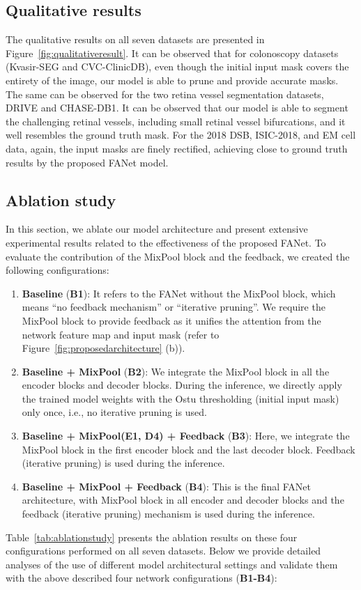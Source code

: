 \documentclass[journal]{IEEEtran}
\begin{document}
\subsection{Qualitative results}
The qualitative results on all seven datasets are presented in Figure~\ref{fig:qualitativeresult}. It can be observed that for colonoscopy datasets (Kvasir-SEG and CVC-ClinicDB), even though the initial input mask covers the entirety of the image, our model is able to prune and provide accurate masks. The same can be observed for the two retina vessel segmentation datasets, DRIVE and CHASE-DB1. It can be observed that our model is able to segment the challenging retinal vessels, including small retinal vessel bifurcations, and it well resembles the ground truth mask. For the 2018 DSB, ISIC-2018, and EM cell data, again, the input masks are finely rectified, achieving close to ground truth results by the proposed FANet model.

\subsection{Ablation study}
In this section, we ablate our model architecture and present extensive experimental results related to the effectiveness of the proposed FANet.  To evaluate the contribution of the MixPool block and the feedback, we created the following configurations:
\begin{enumerate}
    \item \textbf{Baseline} (\textbf{B1}): It refers to the FANet without the MixPool block, which means ``no feedback mechanism'' or ``iterative pruning''. We require the MixPool block to provide feedback as it unifies the attention from the network feature map and input mask (refer to Figure~\ref{fig:proposedarchitecture} (b)).


    \item \textbf{Baseline + MixPool} (\textbf{B2}): We integrate the MixPool block in all the encoder blocks and decoder blocks. During the inference, we directly apply the trained model weights with the Ostu thresholding (initial input mask) only once, i.e., no iterative pruning is used.
    
    \item \textbf{Baseline + MixPool(E1, D4) + Feedback} (\textbf{B3}): Here, we integrate the MixPool block in the first encoder block and the last decoder block. Feedback (iterative pruning) is used during the inference.
    
    \item \textbf{Baseline + MixPool + Feedback} (\textbf{B4}): This is the final FANet architecture, with MixPool block in all encoder and decoder blocks and the feedback (iterative pruning) mechanism is used during the inference.
    
\end{enumerate}
Table~\ref{tab:ablationstudy} presents the ablation results on these four configurations performed on all seven datasets. Below we provide detailed analyses of the use of different model architectural settings and validate them with the above described four network configurations (\textbf{B1-B4}):
\end{document}
